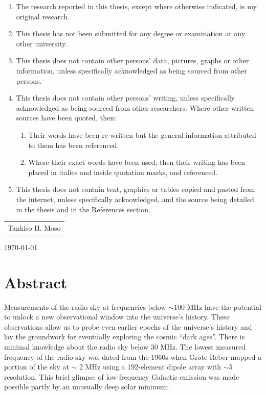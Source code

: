 \documentclass[12pt,a4paper]{report}
\begin{document}
\begin{enumerate}
	\item The research reported in this thesis, except where otherwise indicated, is my original research.
	\item This thesis has not been submitted for any degree or examination at any other university.
	\item This thesis does not contain other persons’ data, pictures, graphs or other information, unless specifically acknowledged as being sourced from other persons.
	\item This thesis does not contain other persons' writing, unless specifically acknowledged as being sourced from other researchers.  Where other written sources have been quoted, then:
\begin{enumerate}
	\item Their words have been re-written but the general information attributed to them has been referenced.
	\item Where their exact words have been used, then their writing has been placed in italics and inside quotation marks, and referenced.
\end{enumerate}
		
	\item This thesis does not contain text, graphics or tables copied and pasted from the internet, unless specifically acknowledged, and the source being detailed in the thesis and in the References section.
\end{enumerate}
\vspace{0.5cm}
	
\begin{table}[h]
\begin{tabular}{c}
\hline
Tankiso H. Moso\\
\end{tabular}
\end{table}	
{\large \today}\\ %


\newpage
\section*{Abstract}
Measurements of the radio sky at frequencies below $\sim$100 MHz have the potential to unlock a new observational window into the universe’s history. These observations allow us to probe even earlier epochs of the universe’s history and lay the groundwork for eventually
exploring the cosmic “dark ages”. There is minimal knowledge about the radio sky below 30 MHz. The lowest measured frequency of the radio sky was dated from the 1960s when Grote Reber mapped a portion of the sky at $ \sim $ 2 MHz using a 192-element dipole array with $\sim$5 \degree
resolution. This brief glimpse of low-frequency Galactic emission was made possible partly by an unusually deep solar minimum.\\
\end{document}
